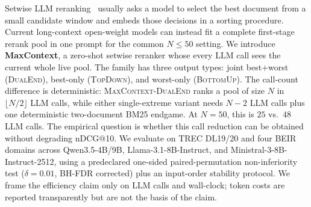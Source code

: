 Setwise LLM reranking~\citep{zhuang2024setwise} usually asks a model to
select the best document from a small candidate window and embeds those
decisions in a sorting procedure. Current long-context open-weight models
can instead fit a complete first-stage rerank pool in one prompt for the
common $N \le 50$ setting. We introduce \textbf{MaxContext}, a zero-shot
setwise reranker whose every LLM call sees the current whole live pool.
The family has three output types: joint best+worst
(\textsc{DualEnd}), best-only (\textsc{TopDown}), and worst-only
(\textsc{BottomUp}). The call-count difference is deterministic:
\textsc{MaxContext-DualEnd} ranks a pool of size $N$ in
$\lfloor N/2 \rfloor$ LLM calls, while either single-extreme variant needs
$N{-}2$ LLM calls plus one deterministic two-document BM25 endgame. At
$N{=}50$, this is $25$ vs.\ $48$ LLM calls. The empirical question is
whether this call reduction can be obtained without degrading nDCG@10. We
evaluate on TREC DL19/20 and four BEIR domains across Qwen3.5-4B/9B,
Llama-3.1-8B-Instruct, and Ministral-3-8B-Instruct-2512, using a
predeclared one-sided paired-permutation non-inferiority test
($\delta=0.01$, BH-FDR corrected) plus an input-order stability protocol.
We frame the efficiency claim only on LLM calls and wall-clock; token
costs are reported transparently but are not the basis of the claim.
